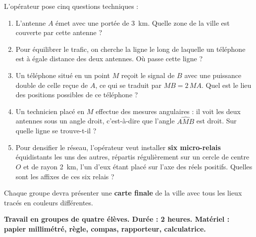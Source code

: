 \documentclass[11pt]{article}
\newcounter{popsec}
\newcounter{popsub}
\newcommand{\courssub}[1]{%
  \stepcounter{popsub}%
  \par\vspace{9pt}\noindent{\popxbold\fontsize{11.5}{13}\selectfont\color{popink}{\color{poporange}\thepopsec.\thepopsub}\hspace{6pt}#1}\par\nopagebreak\vspace{4pt}
}
\begin{document}
L'opérateur pose cinq questions techniques :
\begin{enumerate}
\item L'antenne $A$ émet avec une portée de \SI{3}{km}. Quelle zone de la ville est couverte par cette antenne ?
\item Pour équilibrer le trafic, on cherche la ligne le long de laquelle un téléphone est à égale distance des deux antennes. Où passe cette ligne ?
\item Un téléphone situé en un point $M$ reçoit le signal de $B$ avec une puissance double de celle reçue de $A$, ce qui se traduit par $MB = 2\,MA$. Quel est le lieu des positions possibles de ce téléphone ?
\item Un technicien placé en $M$ effectue des mesures angulaires : il voit les deux antennes sous un angle droit, c'est-à-dire que l'angle $\widehat{AMB}$ est droit. Sur quelle ligne se trouve-t-il ?
\item Pour densifier le réseau, l'opérateur veut installer \textbf{six micro-relais} équidistants les uns des autres, répartis régulièrement sur un cercle de centre $O$ et de rayon \SI{2}{km}, l'un d'eux étant placé sur l'axe des réels positifs. Quelles sont les affixes de ces six relais ?
\end{enumerate}

Chaque groupe devra présenter une \textbf{carte finale} de la ville avec tous les lieux tracés en couleurs différentes.

\courssub{Consignes}

\textbf{Travail en groupes de quatre élèves. Durée : 2 heures. Matériel : papier millimétré, règle, compas, rapporteur, calculatrice.}
\end{document}
